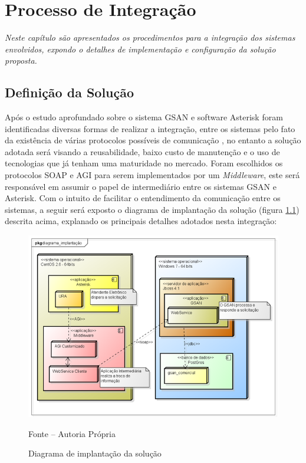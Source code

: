 \chapter[Processo de Integração]{\textbf{P}rocesso de \textbf{I}ntegração}

\textit{Neste capítulo são apresentados os procedimentos para a integração dos sistemas envolvidos, expondo o detalhes de implementação e configuração da solução proposta.}


\section{Definição da Solução}

Após o estudo aprofundado sobre o sistema GSAN e software Asterisk foram identificadas diversas formas de realizar a integração, entre os sistemas pelo fato da existência de várias protocolos possíveis de comunicação , no entanto a solução adotada será visando a reusabilidade, baixo custo de manutenção e o uso de tecnologias que já tenham uma maturidade no mercado. Foram escolhidos os protocolos SOAP e AGI para serem implementados por um \textit{Middleware}, este será responsável em assumir o papel de intermediário entre os sistemas GSAN e Asterisk. Com o intuito de facilitar o entendimento da comunicação entre os sistemas, a seguir será exposto o diagrama de implantação da solução (figura \ref{figura:diagramaImplantacao}) descrita acima, explanado os principais detalhes adotados nesta integração:


\begin{figure}[H]
	\centering
	\includegraphics{figuras/diagrama_implantacao.png}
	\caption{Diagrama de implantação da solução}
	\label{figura:diagramaImplantacao}	
	Fonte – Autoria Própria
\end{figure}


